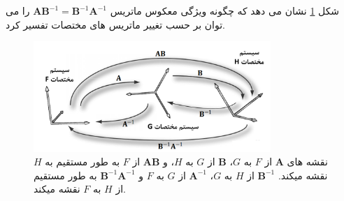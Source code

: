 {\begin{spacing}{1.5}
        شکل \ref{fig:4.Session.1.3.14} نشان می دهد که چگونه ویژگی معکوس ماتریس $\textbf{AB}^{-1}=\textbf{B}^{-1}\textbf{A}^{-1}$ را می توان بر حسب تغییر ماتریس های مختصات تفسیر کرد.

        \begin{figure}[H]
            \centering
            \setlength{\belowcaptionskip}{-10pt}
            \includegraphics[width=0.8\textwidth]{Images/4/3/4.Session.1.3.14}
            \caption {نقشه های $\textbf{A}$ از $F$ به $G$، $\textbf{B}$ از $G$ به $H$، و $\textbf{AB}$ از $F$ به طور مستقیم به $H$ نقشه میکند. $\textbf{B}^{-1}$ از $H$ به $G$، $\textbf{A}^{-1}$ از $G$ به $F$ و $\textbf{B}^{-1}\textbf{A}^{-1}$ به طور مستقیم از $H$ به $F$ نقشه میکند.}
            \label{fig:4.Session.1.3.14}
        \end{figure}

    \end{spacing}
}

